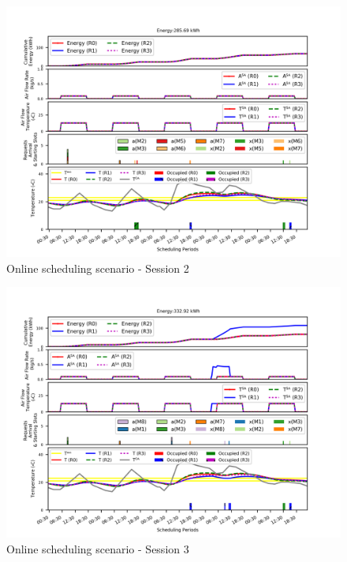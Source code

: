 \begin{figure}[t]
\centering
\includegraphics[width=1\linewidth]{figs/online_r1.png}	
\vspace*{-2ex}
\caption{Online scheduling scenario - Session 2}
\label{fig:online_eg2}
\end{figure}


\begin{figure}[t]
\centering
\includegraphics[width=1\linewidth]{figs/online_r2.png}	
\vspace*{-2ex}
\caption{Online scheduling scenario - Session 3}
\label{fig:online_eg3}
\end{figure}

